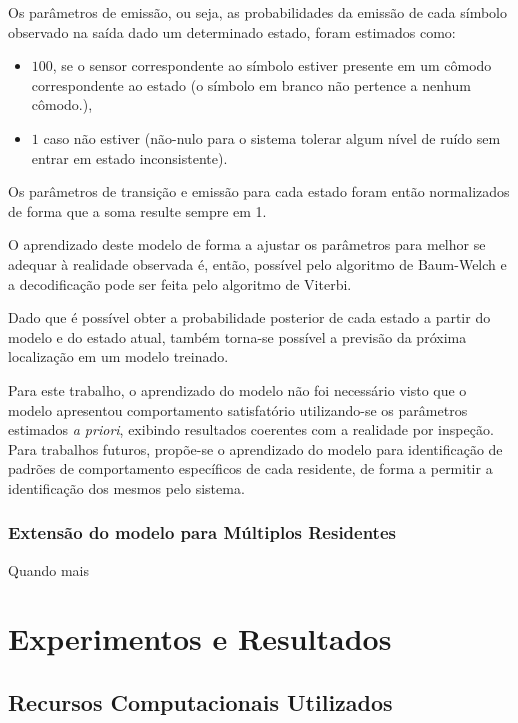 \documentclass[
	12pt,				%
	openright,			%
	twoside,			%
	a4paper,			%
	english,			%
	spanish,			%
	brazil,				%
	]{abntex2}\usepackage[]{graphicx}\usepackage[]{color}
\begin{document}
 
Os parâmetros de emissão, ou seja, as probabilidades da emissão de cada símbolo observado na saída dado um determinado estado, foram estimados como:

\begin{itemize}
	\item $100$, se o sensor correspondente ao símbolo estiver presente em um cômodo correspondente ao estado (o símbolo em branco não pertence a nenhum cômodo.),\\
	\item $1$ caso não estiver (não-nulo para o sistema tolerar algum nível de ruído sem entrar em estado inconsistente).
\end{itemize}

Os parâmetros de transição e emissão para cada estado foram então normalizados de forma que a soma resulte sempre em 1.

O aprendizado deste modelo de forma a ajustar os parâmetros para melhor se adequar à realidade observada é, então, possível pelo algoritmo de Baum-Welch e a decodificação pode ser feita pelo algoritmo de Viterbi.

Dado que é possível obter a probabilidade posterior de cada estado a partir do modelo e do estado atual, também torna-se possível a previsão da próxima localização em um modelo treinado.

Para este trabalho, o aprendizado do modelo não foi necessário visto que o modelo apresentou comportamento satisfatório utilizando-se os parâmetros estimados \textit{a priori}, exibindo resultados coerentes com a realidade por inspeção. Para trabalhos futuros, propõe-se o aprendizado do modelo para identificação de padrões de comportamento específicos de cada residente, de forma a permitir a identificação dos mesmos pelo sistema.


\subsection{Extensão do modelo para Múltiplos Residentes}

Quando mais 

\chapter{Experimentos e Resultados}

\section{Recursos Computacionais Utilizados}
\end{document}
